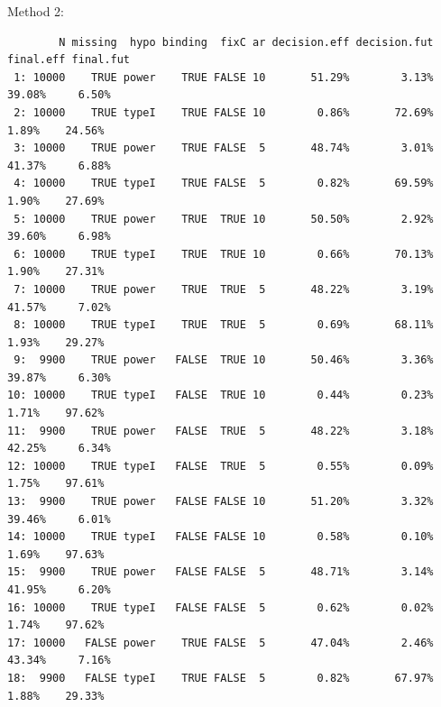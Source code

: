 \documentclass[12pt]{article}
\begin{document}
Method 2:
\begin{verbatim}
        N missing  hypo binding  fixC ar decision.eff decision.fut final.eff final.fut
 1: 10000    TRUE power    TRUE FALSE 10       51.29%        3.13%    39.08%     6.50%
 2: 10000    TRUE typeI    TRUE FALSE 10        0.86%       72.69%     1.89%    24.56%
 3: 10000    TRUE power    TRUE FALSE  5       48.74%        3.01%    41.37%     6.88%
 4: 10000    TRUE typeI    TRUE FALSE  5        0.82%       69.59%     1.90%    27.69%
 5: 10000    TRUE power    TRUE  TRUE 10       50.50%        2.92%    39.60%     6.98%
 6: 10000    TRUE typeI    TRUE  TRUE 10        0.66%       70.13%     1.90%    27.31%
 7: 10000    TRUE power    TRUE  TRUE  5       48.22%        3.19%    41.57%     7.02%
 8: 10000    TRUE typeI    TRUE  TRUE  5        0.69%       68.11%     1.93%    29.27%
 9:  9900    TRUE power   FALSE  TRUE 10       50.46%        3.36%    39.87%     6.30%
10: 10000    TRUE typeI   FALSE  TRUE 10        0.44%        0.23%     1.71%    97.62%
11:  9900    TRUE power   FALSE  TRUE  5       48.22%        3.18%    42.25%     6.34%
12: 10000    TRUE typeI   FALSE  TRUE  5        0.55%        0.09%     1.75%    97.61%
13:  9900    TRUE power   FALSE FALSE 10       51.20%        3.32%    39.46%     6.01%
14: 10000    TRUE typeI   FALSE FALSE 10        0.58%        0.10%     1.69%    97.63%
15:  9900    TRUE power   FALSE FALSE  5       48.71%        3.14%    41.95%     6.20%
16: 10000    TRUE typeI   FALSE FALSE  5        0.62%        0.02%     1.74%    97.62%
17: 10000   FALSE power    TRUE FALSE  5       47.04%        2.46%    43.34%     7.16%
18:  9900   FALSE typeI    TRUE FALSE  5        0.82%       67.97%     1.88%    29.33%
\end{verbatim}
\end{document}
